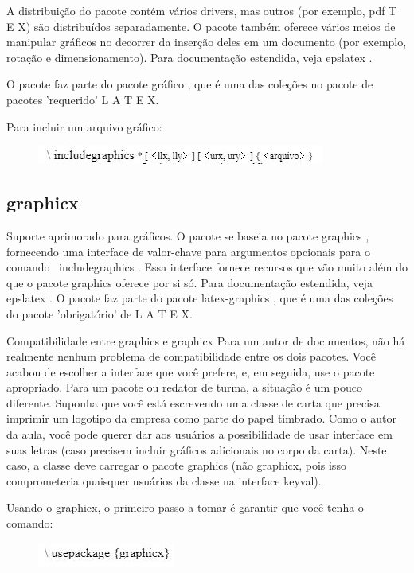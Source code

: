 \documentclass[12pt]{article}
\begin{document}
			A distribuição do pacote contém vários drivers, mas outros (por exemplo, pdf T E X) são distribuídos separadamente. O pacote também oferece vários meios de manipular gráficos no decorrer da inserção deles em um documento (por exemplo, rotação e dimensionamento).
			Para documentação estendida, veja epslatex .
			
			O pacote faz parte do pacote gráfico , que é uma das coleções no pacote de pacotes 'requerido' L A T E X.
			
			Para incluir um arquivo gráfico:
			\begin{figure}[!htb]
				\centering
				\includegraphics[scale=1.1]{18.JPG}
			\end{figure}
		
		\subsection{graphicx}
			Suporte aprimorado para gráficos.
			O pacote se baseia no pacote graphics , fornecendo uma interface de valor-chave para argumentos opcionais para o comando \ includegraphics . Essa interface fornece recursos que vão muito além do que o pacote graphics oferece por si só.
			Para documentação estendida, veja epslatex .
			O pacote faz parte do pacote latex-graphics , que é uma das coleções do pacote 'obrigatório' de L A T E X.
			
			Compatibilidade entre graphics e graphicx Para um autor de documentos, não há realmente nenhum problema de compatibilidade entre os dois pacotes. Você acabou de escolher a interface que você prefere, e, em seguida, use o pacote apropriado. Para um pacote ou redator de turma, a situação é um pouco diferente. Suponha que você está escrevendo uma classe de carta que precisa imprimir um logotipo da empresa como parte do papel timbrado. Como o autor da aula, você pode querer dar aos usuários a possibilidade de usar interface em suas letras (caso precisem incluir gráficos adicionais no corpo da carta). Neste caso, a classe deve carregar o pacote graphics (não graphicx, pois isso comprometeria quaisquer usuários da classe na interface keyval).
			
			
			Usando o graphicx, o primeiro passo a tomar é garantir que você tenha o comando:
			
			\begin{figure}[!htb]
				\centering
				\includegraphics[scale=1.1]{19.JPG}
			\end{figure}
			
\end{document}
